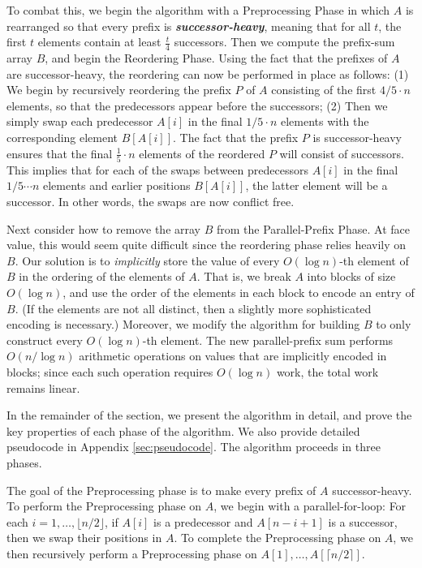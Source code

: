 \documentclass[twoside,leqno,twocolumn]{article}
\newcommand{\defn}[1]{{\textit{\textbf{\boldmath #1}}}}
\renewcommand{\paragraph}[1]{\vspace{0.09in}\noindent{\bf \boldmath #1.}}
\begin{document}
To combat this, we begin the algorithm with a Preprocessing Phase in
which $A$ is rearranged so that every prefix is
\defn{successor-heavy}, meaning that for all $t$, the first $t$
elements contain at least $\frac{t}{4}$ successors. Then we compute
the prefix-sum array $B$, and begin the Reordering Phase. Using the
fact that the prefixes of $A$ are successor-heavy, the reordering can
now be performed in place as follows: (1) We begin by recursively
reordering the prefix $P$ of $A$ consisting of the first $4/5 \cdot n$
elements, so that the predecessors appear before the successors; (2)
Then we simply swap each predecessor $A[i]$ in the final $1/5 \cdot n$
elements with the corresponding element $B[A[i]]$. The fact that the
prefix $P$ is successor-heavy ensures that the final $\frac{1}{5}
\cdot n$ elements of the reordered $P$ will consist of
successors. This implies that for each of the swaps between
predecessors $A[i]$ in the final $1/5 \cdots n$ elements and earlier
positions $B[A[i]]$, the latter element will be a successor. In other
words, the swaps are now conflict free.

Next consider how to remove the array $B$ from the Parallel-Prefix
Phase. At face value, this would seem quite difficult since the
reordering phase relies heavily on $B$. Our solution is to
\textit{implicitly} store the value of every $O(\log n)$-th element of
$B$ in the ordering of the elements of $A$. That is, we break $A$ into
blocks of size $O(\log n)$, and use the order of the elements in each
block to encode an entry of $B$. (If the elements are not all
  distinct, then a slightly more sophisticated encoding is necessary.)
Moreover, we modify the algorithm for building $B$ to only construct
every $O(\log n)$-th element. The new parallel-prefix sum performs
$O(n / \log n)$ arithmetic operations on values that are implicitly
encoded in blocks; since each such operation requires $O(\log n)$
work, the total work remains linear.

In the remainder of the section, we present the algorithm in detail,
and prove the key properties of each phase of the algorithm. We also
provide detailed pseudocode in Appendix \ref{sec:pseudocode}.  The
algorithm proceeds in three phases.

\paragraph{A Preprocessing Phase}
The goal of the Preprocessing phase is to make every prefix of $A$
successor-heavy. To perform the Preprocessing phase on $A$, we begin
with a parallel-for-loop: For each $i = 1, \ldots, \lfloor n /
2\rfloor$, if $A[i]$ is a predecessor and $A[n - i + 1]$ is a
successor, then we swap their positions in $A$. To complete the
Preprocessing phase on $A$, we then recursively perform a
Preprocessing phase on $A[1], \ldots, A[\lceil n / 2 \rceil]$.
\end{document}
